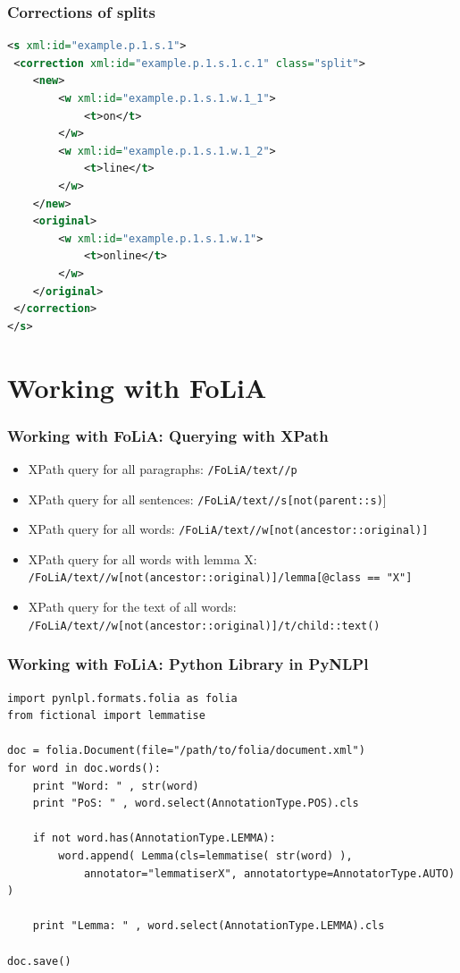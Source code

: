 \documentclass[compress]{beamer}
\begin{document}
\begin{frame}[fragile]
\frametitle{Corrections of splits}

\begin{lstlisting}[language=xml]
<s xml:id="example.p.1.s.1">
 <correction xml:id="example.p.1.s.1.c.1" class="split">
    <new>    
        <w xml:id="example.p.1.s.1.w.1_1">
            <t>on</t>
        </w>
        <w xml:id="example.p.1.s.1.w.1_2">
            <t>line</t>
        </w>                        
    </new>
    <original>
        <w xml:id="example.p.1.s.1.w.1">
            <t>online</t>
        </w>
    </original>
 </correction>               
</s>
\end{lstlisting} 

\end{frame}

\section{Working with FoLiA}

\begin{frame}
\frametitle{Working with FoLiA: Querying with XPath}

    \begin{itemize}
    \item XPath query for all paragraphs: \texttt{/FoLiA/text//p}
    \item XPath query for all sentences: \texttt{/FoLiA/text//s[not(parent::s)}] 
    \item XPath query for all words: \texttt{/FoLiA/text//w[not(ancestor::original)]}
    \item XPath query for all words with lemma X: \\ \texttt{/FoLiA/text//w[not(ancestor::original)]/lemma[@class == "X"]}
    \item XPath query for the text of all words: \\ \texttt{/FoLiA/text//w[not(ancestor::original)]/t/child::text()}
    \end{itemize}

\end{frame}

\begin{frame}[fragile]
\frametitle{Working with FoLiA: Python Library in PyNLPl}

{
\footnotesize
\begin{verbatim}
import pynlpl.formats.folia as folia
from fictional import lemmatise

doc = folia.Document(file="/path/to/folia/document.xml")
for word in doc.words():
    print "Word: " , str(word)
    print "PoS: " , word.select(AnnotationType.POS).cls
    
    if not word.has(AnnotationType.LEMMA):
        word.append( Lemma(cls=lemmatise( str(word) ), 
            annotator="lemmatiserX", annotatortype=AnnotatorType.AUTO) )    

    print "Lemma: " , word.select(AnnotationType.LEMMA).cls   
                 
doc.save()    
\end{verbatim} 
}

\end{frame}
\end{document}
